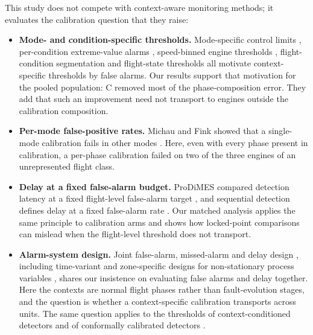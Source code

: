 \documentclass[preprint,11pt,a4paper]{elsarticle}
\begin{document}
This study does not compete with context-aware monitoring methods; it evaluates the calibration question that they raise:
\begin{itemize}
\item \textbf{Mode- and condition-specific thresholds.} Mode-specific control limits \cite{N8}, per-condition extreme-value alarms \cite{N22}, speed-binned engine thresholds \cite{N27}, flight-condition segmentation \cite{N25} and flight-state thresholds \cite{N26} all motivate context-specific thresholds by false alarms. Our results support that motivation for the pooled population: C removed most of the phase-composition error. They add that such an improvement need not transport to engines outside the calibration composition.
\item \textbf{Per-mode false-positive rates.} Michau and Fink showed that a single-mode calibration fails in other modes \cite{N23}. Here, even with every phase present in calibration, a per-phase calibration failed on two of the three engines of an unrepresented flight class.
\item \textbf{Delay at a fixed false-alarm budget.} ProDiMES compared detection latency at a fixed flight-level false-alarm target \cite{N24}, and sequential detection defines delay at a fixed false-alarm rate \cite{N17}. Our matched analysis applies the same principle to calibration arms and shows how locked-point comparisons can mislead when the flight-level threshold does not transport.
\item \textbf{Alarm-system design.} Joint false-alarm, missed-alarm and delay design \cite{N32}, including time-variant and zone-specific designs for non-stationary process variables \cite{N39,N40}, shares our insistence on evaluating false alarms and delay together. Here the contexts are normal flight phases rather than fault-evolution stages, and the question is whether a context-specific calibration transports across units. The same question applies to the thresholds of context-conditioned detectors \cite{N38} and of conformally calibrated detectors \cite{N41}.
\end{itemize}
\end{document}
